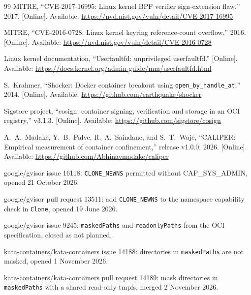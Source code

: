 \begin{thebibliography}{99}
 MITRE, ``CVE-2017-16995: Linux kernel BPF verifier sign-extension flaw,'' 2017. [Online]. Available: \url{https://nvd.nist.gov/vuln/detail/CVE-2017-16995}

 MITRE, ``CVE-2016-0728: Linux kernel keyring reference-count overflow,'' 2016. [Online]. Available: \url{https://nvd.nist.gov/vuln/detail/CVE-2016-0728}

 Linux kernel documentation, ``Userfaultfd: unprivileged userfaultfd.'' [Online]. Available: \url{https://docs.kernel.org/admin-guide/mm/userfaultfd.html}

 S.~Krahmer, ``Shocker: Docker container breakout using \texttt{open\_by\_handle\_at},'' 2014. [Online]. Available: \url{https://github.com/earthquake/shocker}

 Sigstore project, ``cosign: container signing, verification and storage in an OCI registry,'' v3.1.3. [Online]. Available: \url{https://github.com/sigstore/cosign}

 A.~A.~Madake, Y.~B.~Palve, R.~A.~Saindane, and S.~T.~Waje, ``CALIPER: Empirical measurement of container confinement,'' release v1.0.0, 2026. [Online]. Available: \url{https://github.com/Abhinavmadake/caliper}

 google/gvisor issue 16118: \texttt{CLONE\_NEWNS} permitted without CAP\_SYS\_ADMIN, opened 21 October 2026.

 google/gvisor pull request 13511: add \texttt{CLONE\_NEWNS} to the namespace capability check in \texttt{Clone}, opened 19 June 2026.

 google/gvisor issue 9245: \texttt{maskedPaths} and \texttt{readonlyPaths} from the OCI specification, closed as not planned.

 kata-containers/kata-containers issue 14188: directories in \texttt{maskedPaths} are not masked, opened 1 November 2026.

 kata-containers/kata-containers pull request 14189: mask directories in \texttt{maskedPaths} with a shared read-only tmpfs, merged 2 November 2026.

\end{thebibliography}
